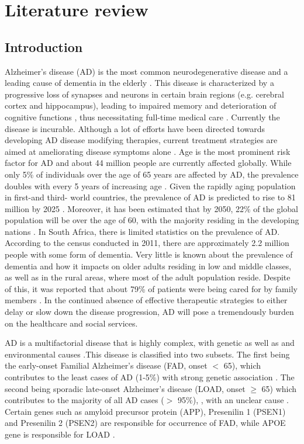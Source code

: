 \chapter{Literature review}
\section{Introduction}
Alzheimer’s disease (AD) is the most common neurodegenerative disease and a leading cause of dementia in the elderly \citep{andrieu2015}. This disease is characterized by a progressive loss of synapses and neurons in certain brain regions (e.g. cerebral cortex and hippocampus), leading to impaired memory and deterioration of cognitive functions \citep{dekosky1990,scheff2006,zare-shahabadi2015}, thus necessitating full-time medical care \citep{prince2013}. Currently the disease is incurable. Although a lot of efforts have been directed towards developing AD disease modifying therapies, current treatment strategies are aimed at ameliorating disease symptoms alone \citep{anand2014,disanto2013}. Age is the most prominent risk factor for AD and about 44 million people are currently affected globally. While only 5\% of individuals over the age of 65 years are affected by AD, the prevalence doubles with every 5 years of increasing age \citep{pimenova2018,qiu2009}. Given the rapidly aging population in first-and third- world countries, the prevalence of AD is predicted to rise to 81 million by 2025 \citep{AlzheimersAssociation2014,Ferri2005}. Moreover, it has been estimated that by 2050, 22\% of the global population will be over the age of 60, with the majority residing in the developing nations \citep{Annear2015,Paddick2013}. In South Africa, there is limited statistics on the prevalence of AD. According to the census conducted in 2011, there are approximately 2.2 million people with some form of dementia. Very little is known about the prevalence of dementia and how it impacts on older adults residing in low and middle classes, as well as in the rural areas, where most of the adult population reside. Despite of this, it was reported that about 79\% of patients were being cared for by family members \citep{Kalula2010}. In the continued absence of effective therapeutic strategies to either delay or slow down the disease progression, AD will pose a tremendously burden on the healthcare and social services. 

AD is a multifactorial disease that is highly complex, with genetic as well as and environmental causes \citep{Dorszewska2016}.This disease is classified into two subsets. The first being the early-onset Familial Alzheimer’s disease (FAD, onset $<$ 65), which contributes to the least cases of AD (1-5\%) with strong genetic association \citep{Musiek2015,Reitz2014,Swerdlow2007}. The second being sporadic late-onset Alzheimer’s disease (LOAD, onset $\geq$ 65) which contributes to the majority of all AD cases ($>$ 95\%), \citep{Musiek2015,Reitz2014,Swerdlow2007}, with an unclear cause \citep{Dorszewska2016,pimenova2018}. Certain genes such as amyloid precursor protein (APP), Presenilin 1 (PSEN1) and Presenilin 2  (PSEN2) are responsible for occurrence of FAD, while APOE gene is responsible for LOAD \citep{Dorszewska2016}.

